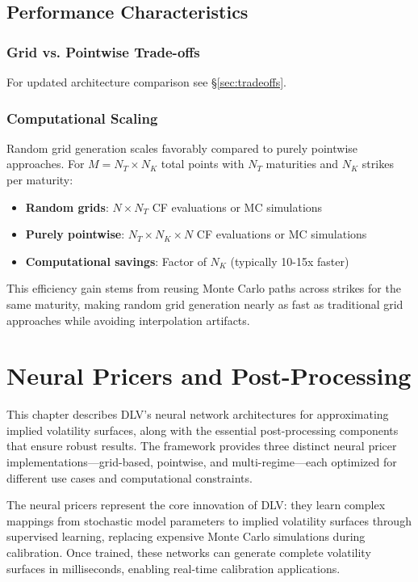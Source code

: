 	
	\section{Performance Characteristics}
	
	\subsection{Grid vs. Pointwise Trade-offs}
	For updated architecture comparison see §\ref{sec:tradeoffs}.
	
	\subsection{Computational Scaling}
	
	Random grid generation scales favorably compared to purely pointwise approaches. For $M = N_T \times N_K$ total points with $N_T$ maturities and $N_K$ strikes per maturity:
	
	\begin{itemize}[nosep]
		\item \textbf{Random grids}: $N \times N_T$ CF evaluations or MC simulations
		\item \textbf{Purely pointwise}: $N_T \times N_K \times N$ CF evaluations or MC simulations
		\item \textbf{Computational savings}: Factor of $N_K$ (typically 10-15x faster)
	\end{itemize}
	
	This efficiency gain stems from reusing Monte Carlo paths across strikes for the same maturity, making random grid generation nearly as fast as traditional grid approaches while avoiding interpolation artifacts.
	
	\chapter{Neural Pricers and Post-Processing}\label{ch:neural_pricers}
	
	This chapter describes DLV's neural network architectures for approximating implied volatility surfaces, along with the essential post-processing components that ensure robust results. The framework provides three distinct neural pricer implementations—grid-based, pointwise, and multi-regime—each optimized for different use cases and computational constraints.
	
	The neural pricers represent the core innovation of DLV: they learn complex mappings from stochastic model parameters to implied volatility surfaces through supervised learning, replacing expensive Monte Carlo simulations during calibration. Once trained, these networks can generate complete volatility surfaces in milliseconds, enabling real-time calibration applications.
	
